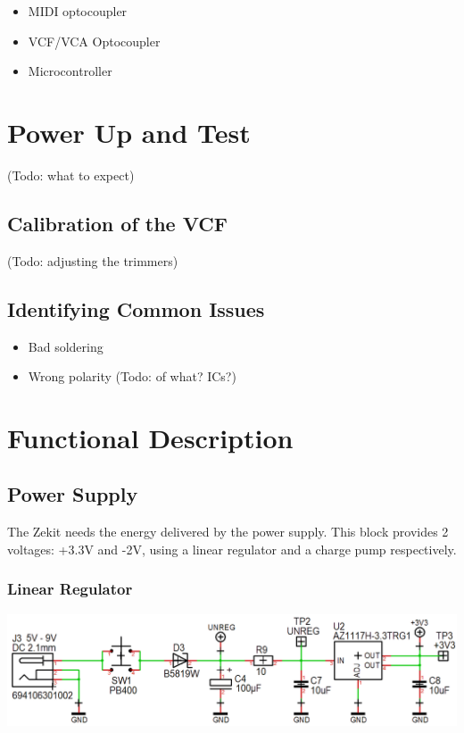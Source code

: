 \documentclass{scrartcl}
\begin{document}
\begin{itemize}
    \item MIDI optocoupler
    \item VCF/VCA Optocoupler
    \item Microcontroller
\end{itemize}

\section{Power Up and Test}

 (Todo: what to expect)

\subsection{Calibration of the VCF}

(Todo: adjusting the trimmers)

\subsection{Identifying Common Issues}

\begin{itemize}
    \item Bad soldering
    \item Wrong polarity (Todo: of what? ICs?)
\end{itemize}

\pagebreak


\section{Functional Description}

\subsection{Power Supply}

The Zekit needs the energy delivered by the power supply. This block provides 2 voltages: +3.3V and -2V, using a linear regulator and a charge pump respectively.

\subsubsection{Linear Regulator}

\begin{center}
    \includegraphics[scale=0.4]{assets/schema-power.png}
\end{center}
\end{document}
